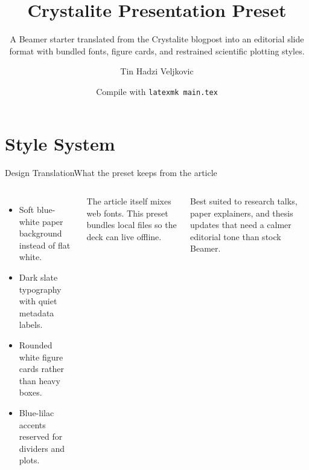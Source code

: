 \documentclass[aspectratio=169,professionalfonts]{beamer}
\title{Crystalite Presentation Preset}
\subtitle{A Beamer starter translated from the Crystalite blogpost into an editorial slide format with bundled fonts, figure cards, and restrained scientific plotting styles.}
\author{Tin Hadzi Veljkovic}
\institute{Materials ML / Diffusion Models}
\date{Compile with \texttt{latexmk main.tex}}
\begin{document}
\begin{frame}[plain]
  \titlepage
\end{frame}

\section{Style System}

\begin{frame}{Design Translation}{What the preset keeps from the article}
  \small
  \begin{columns}[T,onlytextwidth]
    \begin{itemize}
      \item Soft blue-white paper background instead of flat white.
      \item Dark slate typography with quiet metadata labels.
      \item Rounded white figure cards rather than heavy boxes.
      \item Blue-lilac accents reserved for dividers and plots.
    \end{itemize}
    \begin{crystalitenote}

      The article itself mixes web fonts. This preset bundles local files so the deck can live
      offline.
    \end{crystalitenote}
    \vspace{0.2cm}

    {\color{crystalitemuted}\scriptsize Best suited to research talks, paper explainers, and thesis
    updates that need a calmer editorial tone than stock Beamer.}
  \end{columns}
\end{frame}
\end{document}
